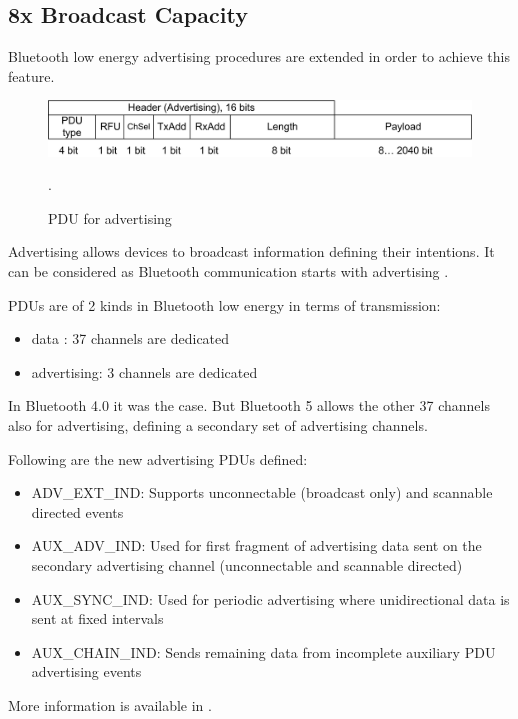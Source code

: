 \documentclass[journal, a4paper]{IEEEtran}
\begin{document}
\subsection{8x Broadcast Capacity}

Bluetooth low energy advertising procedures are extended in order to achieve this feature.

\begin{figure}[!hbt]
		\begin{center}
		\includegraphics [width=.4\textwidth]{pdu_advertising.png}
		\caption{PDU for advertising }.
		\label{fig:advertising}
		\end{center}
\end{figure}

Advertising allows devices to broadcast information defining their intentions. It can be considered as Bluetooth communication starts with advertising \cite{ADVERTISING}.

PDUs are of 2 kinds in Bluetooth low energy in terms of transmission:
\begin{itemize}
\item data : 37 channels are dedicated 
\item advertising: 3 channels are dedicated
\end{itemize}

In Bluetooth 4.0 it was the case. But Bluetooth 5 allows the other 37 channels also for advertising, defining a secondary set of advertising channels.

Following are the new advertising PDUs defined:

\begin{itemize}
\item ADV\_EXT\_IND: Supports unconnectable (broadcast only) and scannable directed events
\item AUX\_ADV\_IND: Used for first fragment of advertising data sent on the secondary advertising channel (unconnectable and scannable directed)
\item AUX\_SYNC\_IND: Used for periodic advertising where unidirectional data is sent at fixed intervals
\item AUX\_CHAIN\_IND: Sends remaining data from incomplete auxiliary PDU advertising events
\end{itemize}

More information is available in \cite{ADVERTISING_EXTENDED}.
\end{document}
